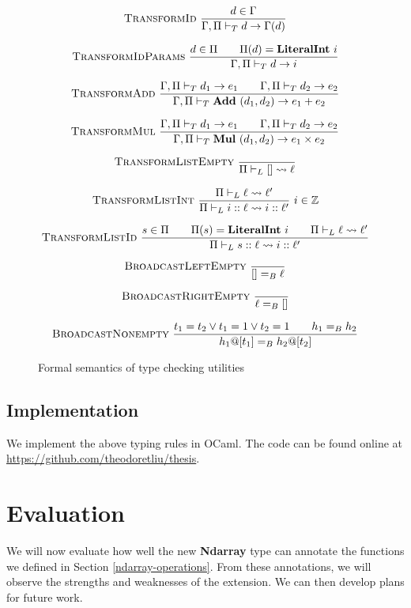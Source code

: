 \documentclass{report}
\begin{document}
\begin{figure}
    $$\textsc{TransformId}~\frac{d \in \Gamma}{\Gamma, \Pi \vdash_T d \rightarrow \Gamma(d)}$$

    $$\textsc{TransformIdParams}~\frac{d \in \Pi \qquad \Pi(d) = \textbf{LiteralInt}~i}{\Gamma, \Pi \vdash_T d \rightarrow i}$$

    $$\textsc{TransformAdd}~\frac{\Gamma, \Pi \vdash_T d_1 \rightarrow e_1 \qquad \Gamma, \Pi \vdash_T d_2 \rightarrow e_2}{\Gamma , \Pi \vdash_T \textbf{Add}~(d_1, d_2) \rightarrow e_1 + e_2}$$

    $$\textsc{TransformMul}~\frac{\Gamma, \Pi \vdash_T d_1 \rightarrow e_1 \qquad \Gamma, \Pi \vdash_T d_2 \rightarrow e_2}{\Gamma, \Pi \vdash_T \textbf{Mul}~(d_1, d_2) \rightarrow e_1 \times e_2}$$

    $$\textsc{TransformListEmpty}~\frac{}{\Pi \vdash_L [] \rightsquigarrow \ell}$$

    $$\textsc{TransformListInt}~\frac{\Pi \vdash_L \ell \rightsquigarrow \ell'}{\Pi \vdash_L i :: \ell \rightsquigarrow i :: \ell'}~i \in \mathbb Z$$

    $$\textsc{TransformListId}~\frac{s \in \Pi \qquad \Pi(s) = \textbf{LiteralInt}~i \qquad \Pi \vdash_L \ell \rightsquigarrow \ell'}{\Pi \vdash_L s :: \ell \rightsquigarrow i :: \ell'}$$

    $$\textsc{BroadcastLeftEmpty}~\frac{}{[] =_B \ell}$$

    $$\textsc{BroadcastRightEmpty}~\frac{}{\ell =_B []}$$

    $$\textsc{BroadcastNonempty}~\frac{t_1 = t_2 \lor t_1 = 1 \lor t_2 = 1 \qquad h_1 =_B h_2}{h_1 @ [t_1] =_B h_2 @ [t_2]}$$

    \caption{Formal semantics of type checking utilities}
    \label{semantics:utils}
\end{figure}

\section{Implementation}

We implement the above typing rules in OCaml. The code can be found online at \url{https://github.com/theodoretliu/thesis}.

\chapter{Evaluation}

We will now evaluate how well the new \textbf{Ndarray} type can annotate the functions we defined in Section \ref{ndarray-operations}. From these annotations, we will observe the strengths and weaknesses of the extension. We can then develop plans for future work.
\end{document}
